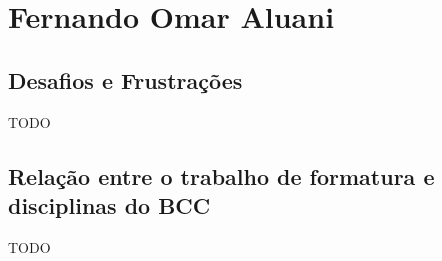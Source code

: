 \chapter{Fernando Omar Aluani}
\label{sec:omar_subjetiva}

\section{Desafios e Frustrações}
\label{sec:omar:desafios_frustracoes}

TODO

\section{Relação entre o trabalho de formatura e disciplinas do BCC}
\label{sec:omar:relacao_disciplinas_bcc}

TODO

